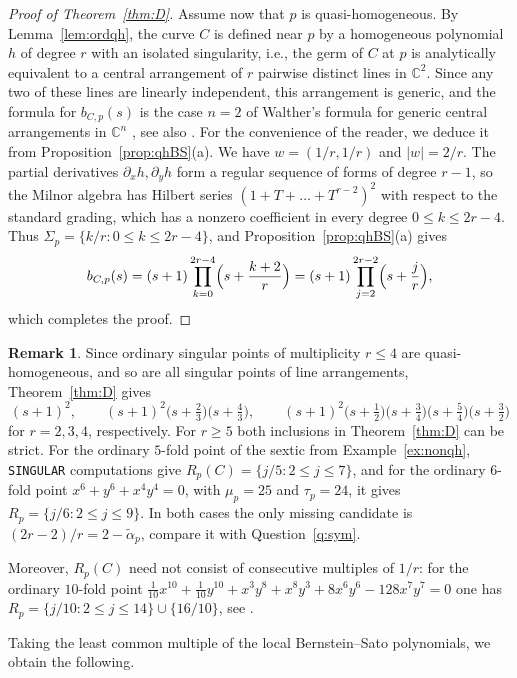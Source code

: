 \documentclass[11pt]{amsart}
\theoremstyle{definition}
\newtheorem{remark}[theorem]{Remark}
\numberwithin{equation}{section}
\newcommand{\CC}{\mathbb{C}}
\newcommand{\talpha}{\widetilde{\alpha}}
\newcommand{\gadd}[1]{#1}
\begin{document}
\begin{proof}[Proof of Theorem~\ref{thm:D}]
Assume now that $p$ is quasi-homogeneous.
By Lemma~\ref{lem:ordqh}, the curve $C$ is defined near $p$ by a homogeneous polynomial $h$
of degree $r$ with an isolated singularity, i.e., the germ of $C$ at $p$ is analytically
equivalent to a central arrangement of $r$ pairwise distinct lines in $\CC^2$.
Since any two of these lines are linearly independent, this arrangement is generic, and the
formula for $b_{C,p}(s)$ is the case $n=2$ of Walther's formula for generic central
arrangements in $\CC^n$ \cite{Wal}, see also \cite{SaH}.
For the convenience of the reader, we deduce it from Proposition~\ref{prop:qhBS}(a).
We have $w=(1/r,1/r)$ and $|w|=2/r$.
The partial derivatives $\partial_xh,\partial_yh$ form a regular sequence of forms of
degree $r-1$, so the Milnor algebra has Hilbert series $(1+T+\dots+T^{r-2})^2$ with respect
to the standard grading, which has a nonzero coefficient in every degree $0\le k\le2r-4$.
Thus $\Sigma_p=\{k/r\colon0\le k\le2r-4\}$, and Proposition~\ref{prop:qhBS}(a) gives
\[
b_{C,p}(s)=(s+1)\prod_{k=0}^{2r-4}\Bigl(s+\frac{k+2}r\Bigr)
=(s+1)\prod_{j=2}^{2r-2}\Bigl(s+\frac jr\Bigr),
\]
which completes the proof.
\end{proof}

\begin{remark}\label{rem:ordBS}
Since ordinary singular points of multiplicity $r\le4$ are quasi-homogeneous, and so are all singular points of line arrangements, Theorem~\ref{thm:D} gives
\[
(s+1)^2,\qquad (s+1)^2\bigl(s+\tfrac23\bigr)\bigl(s+\tfrac43\bigr),\qquad (s+1)^2\bigl(s+\tfrac12\bigr)\bigl(s+\tfrac34\bigr)\bigl(s+\tfrac54\bigr)\bigl(s+\tfrac32\bigr)
\]
for $r=2,3,4$, respectively.
For $r\ge5$ both inclusions in Theorem~\ref{thm:D} can be strict.
For the ordinary $5$-fold point of the sextic from Example~\ref{ex:nonqh}, \texttt{SINGULAR} computations give $R_p(C)=\{j/5\colon2\le j\le7\}$, and for the ordinary $6$-fold point $x^6+y^6+x^4y^4=0$, with $\mu_p=25$ and $\tau_p=24$, it gives $R_p=\{j/6\colon2\le j\le9\}$.
In both cases the only missing candidate is $(2r-2)/r=2-\talpha_p$, compare it with Question~\ref{q:sym}.

Moreover, $R_p(C)$ need not consist of consecutive multiples of $1/r$: for the ordinary $10$-fold point $\frac1{10}x^{10}+\frac1{10}y^{10}+x^3y^8+x^8y^3+8x^6y^6-128x^7y^7=0$ one has $\gadd{R_p}=\{j/10\colon2\le j\le14\}\cup\{16/10\}$, see \cite[page 7]{SaBP}.
\end{remark}

Taking the least common multiple of the local Bernstein--Sato polynomials, we obtain the following.
\end{document}
